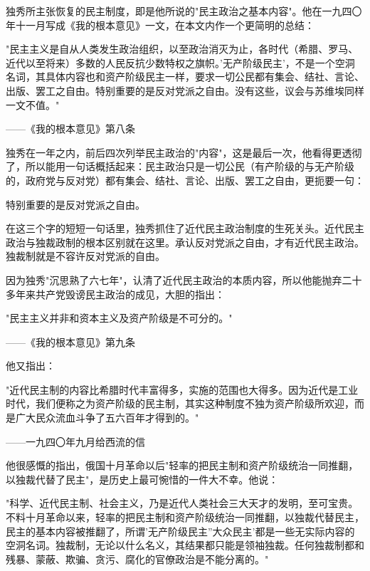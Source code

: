 \documentclass[
  openany,           %
  12pt,              %
  a4paper            %
]{ctexbook}
\newcommand{\fang}{\CJKfamily{fang}}
\newenvironment{quoteindent}
  {\list{}{\leftmargin=4em\rightmargin=0pt}\item\relax\fang\small}
  {\endlist}
\begin{document}
独秀所主张恢复的民主制度，即是他所说的"民主政治之基本内容"。他在一九四〇年十一月写成《我的根本意见》一文，在本文内作一个更简明的总结：

\begin{quoteindent}
"民主主义是自从人类发生政治组织，以至政治消灭为止，各时代（希腊、罗马、近代以至将来）多数的人民反抗少数特权之旗帜。'无产阶级民主'，不是一个空洞名词，其具体内容也和资产阶级民主一样，要求一切公民都有集会、结社、言论、出版、罢工之自由。特别重要的是反对党派之自由。没有这些，议会与苏维埃同样一文不值。"
\end{quoteindent}

\hfill ——《我的根本意见》第八条

独秀在一年之内，前后四次列举民主政治的"内容"，这是最后一次，他看得更透彻了，所以能用一句话概括起来：民主政治只是一切公民（有产阶级的与无产阶级的，政府党与反对党）都有集会、结社、言论、出版、罢工之自由，更扼要一句：

\quad\quad 特别重要的是反对党派之自由。

在这三个字的短短一句话里，独秀抓住了近代民主政治制度的生死关头。近代民主政治与独裁政制的根本区别就在这里。承认反对党派之自由，才有近代民主政治。独裁制就是不容许反对党派的自由。

因为独秀"沉思熟了六七年"，认清了近代民主政治的本质内容，所以他能抛弃二十多年来共产党毁谤民主政治的成见，大胆的指出：

\begin{quoteindent}
"民主主义并非和资本主义及资产阶级是不可分的。"
\end{quoteindent}

\hfill ——《我的根本意见》第九条

他又指出：

\begin{quoteindent}
"近代民主制的内容比希腊时代丰富得多，实施的范围也大得多。因为近代是工业时代，我们便称之为资产阶级的民主制，其实这种制度不独为资产阶级所欢迎，而是广大民众流血斗争了五六百年才得到的。"
\end{quoteindent}

\hfill ——一九四〇年九月给西流的信

他很感慨的指出，俄国十月革命以后"轻率的把民主制和资产阶级统治一同推翻，以独裁代替了民主"，是历史上最可惋惜的一件大不幸。他说：

\begin{quoteindent}
"科学、近代民主制、社会主义，乃是近代人类社会三大天才的发明，至可宝贵。不料十月革命以来，轻率的把民主制和资产阶级统治一同推翻，以独裁代替民主，民主的基本内容被推翻了，所谓'无产阶级民主''大众民主'都是一些无实际内容的空洞名词。独裁制，无论以什么名义，其结果都只能是领袖独裁。任何独裁制都和残暴、蒙蔽、欺骗、贪污、腐化的官僚政治是不能分离的。"
\end{quoteindent}
\end{document}

